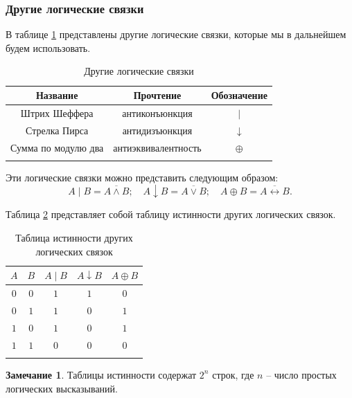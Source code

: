 \documentclass[a5paper, 11pt]{extarticle}
\theoremstyle{definition}
\theoremstyle{definition}
\theoremstyle{definition}
\newtheorem*{note*}{Замечание}
\numberwithin{figure}{section}
\numberwithin{table}{section}
\begin{document}
\subsubsection{Другие логические связки}

В таблице \ref{tab:other-logical-connectives} представлены другие логические связки, которые мы в дальнейшем будем использовать.

{
\renewcommand*{\arraystretch}{1.5}
\begin{longtable}{|c|c|c|}
    \hline
    \textbf{Название}   & \textbf{Прочтение}  & \textbf{Обозначение} \\
    \hline
    Штрих Шеффера       & антиконъюнкция      & \(|\)                \\
    \hline
    Стрелка Пирса       & антидизъюнкция      & \(\downarrow\)       \\
    \hline
    Сумма по модулю два & антиэквивалентность & \(\oplus\)           \\
    \hline
    \caption{Другие логические связки}
    \label{tab:other-logical-connectives}
\end{longtable}
}

Эти логические связки можно представить следующим образом:
\[
    A \mathop{|} B = \overline{A \land B};
    \quad
    A \downarrow B = \overline{A \lor B};
    \quad
    A \oplus B = \overline{A \leftrightarrow B}.
\]

Таблица \ref{tab:truth-table-olc} представляет собой таблицу истинности других логических связок.

{
\renewcommand*{\arraystretch}{1.5}
\begin{longtable}{|c|c|c|c|c|}
    \hline
    \(A\) & \(B\) & \(A \mathop{|} B\) & \(A \downarrow B\) & \(A \oplus B\) \\
    \hline
    \(0\) & \(0\) & \(1\)              & \(1\)              & \(0\)          \\
    \hline
    \(0\) & \(1\) & \(1\)              & \(0\)              & \(1\)          \\
    \hline
    \(1\) & \(0\) & \(1\)              & \(0\)              & \(1\)          \\
    \hline
    \(1\) & \(1\) & \(0\)              & \(0\)              & \(0\)          \\
    \hline
    \caption{Таблица истинности других логических связок}
    \label{tab:truth-table-olc}
\end{longtable}
}

\begin{note*}
    Таблицы истинности содержат \(2^n\) строк, где \(n\) -- число простых логических высказываний.
\end{note*}
\end{document}
